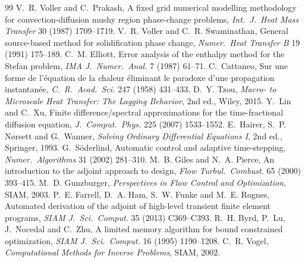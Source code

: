 \documentclass[11pt]{article}
\numberwithin{equation}{section}
\theoremstyle{remark}
\begin{document}
\begin{thebibliography}{99}
 V.~R. Voller and C.~Prakash, A fixed grid numerical
  modelling methodology for convection-diffusion mushy region phase-change
  problems, \emph{Int.\ J.\ Heat Mass Transfer} 30 (1987) 1709--1719.
 V.~R. Voller and C.~R. Swaminathan, General source-based
  method for solidification phase change, \emph{Numer.\ Heat Transfer B} 19
  (1991) 175--189.
 C.~M. Elliott, Error analysis of the enthalpy method for
  the Stefan problem, \emph{IMA J.\ Numer.\ Anal.} 7 (1987) 61--71.
 C.~Cattaneo, Sur une forme de l'\'equation de la chaleur
  \'eliminant le paradoxe d'une propagation instantan\'ee, \emph{C.\ R.\ Acad.\
  Sci.} 247 (1958) 431--433.
 D.~Y. Tzou, \emph{Macro- to Microscale Heat Transfer: The
  Lagging Behavior}, 2nd ed., Wiley, 2015.
 Y.~Lin and C.~Xu, Finite difference/spectral approximations
  for the time-fractional diffusion equation, \emph{J.\ Comput.\ Phys.} 225
  (2007) 1533--1552.
 E.~Hairer, S.~P. N{\o}rsett and G.~Wanner, \emph{Solving
  Ordinary Differential Equations I}, 2nd ed., Springer, 1993.
 G.~S\"oderlind, Automatic control and adaptive
  time-stepping, \emph{Numer.\ Algorithms} 31 (2002) 281--310.
 M.~B. Giles and N.~A. Pierce, An introduction to the
  adjoint approach to design, \emph{Flow Turbul.\ Combust.} 65 (2000) 393--415.
\bibitem{gunzburger2003} M.~D. Gunzburger, \emph{Perspectives in Flow Control
  and Optimization}, SIAM, 2003.
 P.~E. Farrell, D.~A. Ham, S.~W. Funke and M.~E. Rognes,
  Automated derivation of the adjoint of high-level transient finite element
  programs, \emph{SIAM J.\ Sci.\ Comput.} 35 (2013) C369--C393.
 R.~H. Byrd, P.~Lu, J.~Nocedal and C.~Zhu, A limited memory
  algorithm for bound constrained optimization, \emph{SIAM J.\ Sci.\ Comput.}
  16 (1995) 1190--1208.
 C.~R. Vogel, \emph{Computational Methods for Inverse
  Problems}, SIAM, 2002.
\end{thebibliography}
\end{document}
